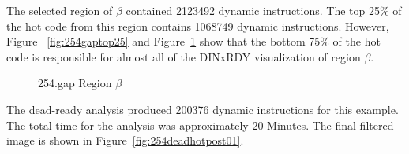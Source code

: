 \documentclass[defaultstyle,11pt]{thesis}
\begin{document}
The selected region of $\beta$ contained 2123492 dynamic instructions.
The top 25\% of the hot code from this region contains 1068749 dynamic
instructions.  However, Figure ~\ref{fig:254gaptop25} and
Figure~\ref{fig:254gapbottom75} show that the bottom 75\% of the hot
code is responsible for almost all of the DINxRDY visualization of
region $\beta$.

\begin{figure}
  \centering
  \caption{254.gap Region $\beta$}
  \label{fig:254gaptop25}
  \label{fig:254gapbottom75}
\end{figure}

The dead-ready analysis produced 200376 dynamic
instructions for this example.  The total time for the analysis was approximately 20
Minutes.  The final filtered image is shown in
Figure~\ref{fig:254deadhotpost01}.
\end{document}

